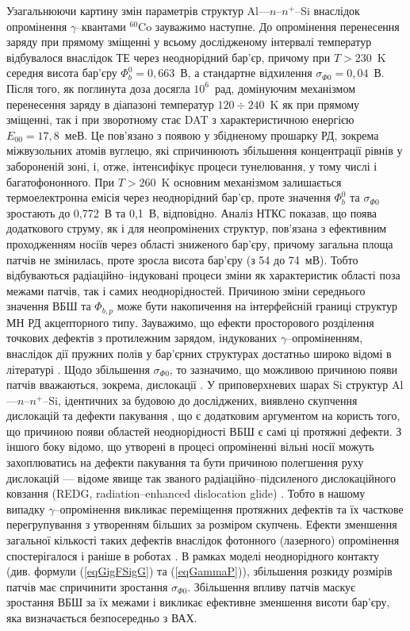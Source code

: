 Узагальнюючи картину змін параметрів структур Al---$n$--$n^+$--Si внаслідок опромінення $\gamma$--квантами $^{60}$Co зауважимо наступне.
До опромінення перенесення заряду при прямому зміщенні у всьому дослідженому інтервалі температур відбувалося внаслідок ТЕ через неоднорідний бар'єр,
причому при $T>230$~K середня висота бар'єру $\Phi_b^0=0,663$~В, а стандартне відхилення $\sigma_{\Phi0}=0,04$~В.
Після того, як поглинута доза досягла $10^6$~рад, домінуючим механізмом перенесення заряду в діапазоні температур
$120\div240$~K як при прямому зміщенні, так і при зворотному стає DAT з характеристичною енергією $E_{00}=17,8$~меВ.
Це пов'язано з появою у збідненому прошарку РД, зокрема міжвузольних атомів вуглецю, які спричинюють збільшення
концентрації рівнів у забороненій зоні, і, отже, інтенсифікує процеси тунелювання, у тому числі і багатофононного.
При $T>260$~K основним механізмом залишається термоелектронна емісія через неоднорідний бар'єр, проте значення $\Phi_b^0$ та $\sigma_{\Phi0}$
зростають до 0,772~В та 0,1~В, відповідно.
Аналіз НТКС показав, що поява додаткового струму, як і для неопромінених структур, пов'язана з ефективним проходженням носіїв через області зниженого бар'єру,
причому загальна площа патчів не змінилась, проте зросла висота бар'єру (з 54 до 74~мВ).
Тобто відбуваються радіаційно--індуковані процеси зміни як характеристик області поза межами патчів, так і самих неоднорідностей.
Причиною зміни середнього значення ВБШ та $\Phi_{b,p}$ може бути накопичення на інтерфейсній границі структур МН
РД акцепторного типу.
Зауважимо, що ефекти просторового розділення точкових дефектів з протилежним зарядом, індукованих $\gamma$--опроміненням, внаслідок дії пружних полів
у бар'єрних структурах достатньо широко відомі в літературі \cite{Shcherb, Muzafarova}.
Щодо збільшення $\sigma_{\Phi0}$, то зазначимо, що можливою причиною появи патчів вважаються, зокрема, дислокації \cite{GELCZUK2014}.
У приповерхневих шарах Si структур Al---$n$--$n^+$--Si, ідентичних за будовою до досліджених, виявлено скупчення дислокацій та дефекти пакування \cite{VOROBETS2005,Vorobets},
що є додатковим аргументом на користь того, що причиною появи областей неоднорідності ВБШ є самі ці протяжні дефекти.
З іншого боку відомо, що утворені в процесі опроміненні вільні носії можуть захоплюватись на дефекти пакування та бути причиною
полегшення руху дислокацій --- відоме явище так званого радіаційно--підсиленого дислокаційного ковзання (REDG, radiation--enhanced dislocation glide) \cite{REDG}.
Тобто в нашому випадку $\gamma$--опромінення викликає переміщення протяжних дефектів та їх часткове перегрупування з утворенням більших за розміром
скупчень.
Ефекти зменшення загальної кількості таких дефектів внаслідок фотонного (лазерного) опромінення спостерігалося і раніше в роботах \cite{VOROBETS2005,Vorobets}.
В рамках моделі неоднорідного контакту (див. формули (\ref{eqGigFSigG}) та (\ref{eqGammaP})), збільшення розкиду розмірів патчів має спричинити зростання $\sigma_{\Phi0}$.
Збільшення впливу патчів маскує зростання ВБШ за їх межами і викликає ефективне зменшення висоти бар'єру, яка визначається безпосередньо з ВАХ.

